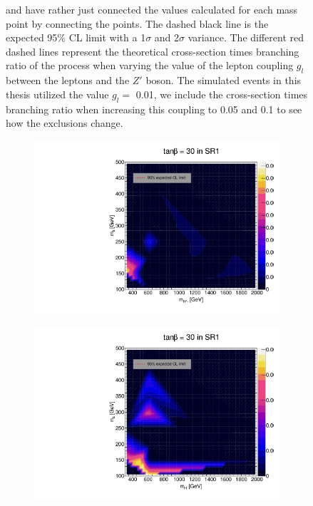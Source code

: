 \documentclass[12pt, a4paper]{book}
\begin{document}
\begin{figure}[!ht]
{   and have rather just connected the values calculated for each mass point by connecting the points. The dashed black line is the expected 95\% CL limit with a 1$\sigma$ and 2$\sigma$ variance. 
   The different red dashed lines represent the theoretical cross-section times branching ratio of the process when varying the value of the lepton coupling $g_l$ between the leptons and the $Z'$ boson. The simulated events in this thesis utilized the value $g_l=$ 0.01, we include the cross-section times branching ratio when increasing this coupling to 0.05 and 0.1 to see how the exclusions change.  }\label{fig:EFT_LDS_exclusion_ee_uu}
\end{figure}

\begin{figure}[!ht]
	\centering
	\begin{subfigure}[b]{0.49\textwidth}
      \centering
      \includegraphics[width=1\textwidth]{Limits/Model_independent/50-100/2HDM/2HDM_ee_tb30.pdf}
   \end{subfigure}
   \hfill
   \begin{subfigure}[b]{0.49\textwidth}
      \centering
      \includegraphics[width=1\textwidth]{Limits/Model_independent/50-100/2HDM/2HDM_uu_tb30.pdf}

\end{subfigure}
\end{figure}
\end{document}
